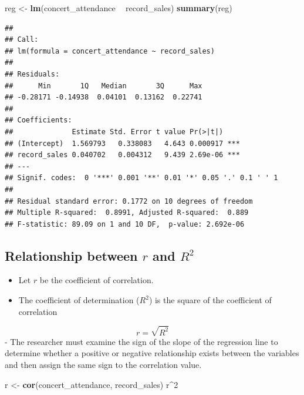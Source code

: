 \documentclass[]{book}
\newenvironment{Shaded}{\begin{snugshade}}{\end{snugshade}}
\newcommand{\DecValTok}[1]{\textcolor[rgb]{0.00,0.00,0.81}{#1}}
\newcommand{\KeywordTok}[1]{\textcolor[rgb]{0.13,0.29,0.53}{\textbf{#1}}}
\newcommand{\NormalTok}[1]{#1}
\newcommand{\OperatorTok}[1]{\textcolor[rgb]{0.81,0.36,0.00}{\textbf{#1}}}
\newcommand{\StringTok}[1]{\textcolor[rgb]{0.31,0.60,0.02}{#1}}
\providecommand{\tightlist}{%
  \setlength{\itemsep}{0pt}\setlength{\parskip}{0pt}}
\begin{document}
\begin{Shaded}
\begin{Highlighting}[]
\NormalTok{reg <-}\StringTok{ }\KeywordTok{lm}\NormalTok{(concert_attendance }\OperatorTok{~}\StringTok{ }\NormalTok{record_sales)}
\KeywordTok{summary}\NormalTok{(reg)}
\end{Highlighting}
\end{Shaded}

\begin{verbatim}
## 
## Call:
## lm(formula = concert_attendance ~ record_sales)
## 
## Residuals:
##      Min       1Q   Median       3Q      Max 
## -0.28171 -0.14938  0.04101  0.13162  0.22741 
## 
## Coefficients:
##              Estimate Std. Error t value Pr(>|t|)    
## (Intercept)  1.569793   0.338083   4.643 0.000917 ***
## record_sales 0.040702   0.004312   9.439 2.69e-06 ***
## ---
## Signif. codes:  0 '***' 0.001 '**' 0.01 '*' 0.05 '.' 0.1 ' ' 1
## 
## Residual standard error: 0.1772 on 10 degrees of freedom
## Multiple R-squared:  0.8991, Adjusted R-squared:  0.889 
## F-statistic: 89.09 on 1 and 10 DF,  p-value: 2.692e-06
\end{verbatim}

\hypertarget{relationship-between-r-and-r2}{%
\subsection{\texorpdfstring{Relationship between \(r\) and \(R^2\)}{Relationship between r and R\^{}2}}\label{relationship-between-r-and-r2}}

\begin{itemize}
\tightlist
\item
  Let \(r\) be the coefficient of correlation.
\item
  The coefficient of determination (\(R^2\)) is the square of the coefficient of correlation
\end{itemize}

\[r = \sqrt{R^2}\]
- The researcher must examine the sign of the slope of the regression line to determine whether a positive or negative relationship exists between the variables and then assign the same sign to the correlation value.

\begin{Shaded}
\begin{Highlighting}[]
\NormalTok{r <-}\StringTok{ }\KeywordTok{cor}\NormalTok{(concert_attendance, record_sales)}
\NormalTok{r}\OperatorTok{^}\DecValTok{2}
\end{Highlighting}
\end{Shaded}
\end{document}
